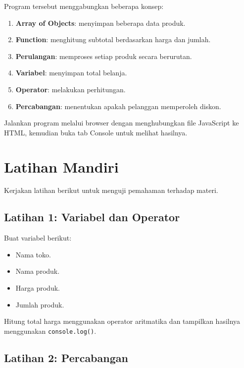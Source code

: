 \documentclass[12pt,a4paper]{article}
\begin{document}
Program tersebut menggabungkan beberapa konsep:

\begin{enumerate}
    \item \textbf{Array of Objects}: menyimpan beberapa
    data produk.
    \item \textbf{Function}: menghitung subtotal
    berdasarkan harga dan jumlah.
    \item \textbf{Perulangan}: memproses setiap produk
    secara berurutan.
    \item \textbf{Variabel}: menyimpan total belanja.
    \item \textbf{Operator}: melakukan perhitungan.
    \item \textbf{Percabangan}: menentukan apakah
    pelanggan memperoleh diskon.
\end{enumerate}

Jalankan program melalui browser dengan menghubungkan
file JavaScript ke HTML, kemudian buka tab Console
untuk melihat hasilnya.

\section{Latihan Mandiri}

Kerjakan latihan berikut untuk menguji pemahaman
terhadap materi.

\subsection{Latihan 1: Variabel dan Operator}

Buat variabel berikut:

\begin{itemize}
    \item Nama toko.
    \item Nama produk.
    \item Harga produk.
    \item Jumlah produk.
\end{itemize}

Hitung total harga menggunakan operator aritmatika
dan tampilkan hasilnya menggunakan
\texttt{console.log()}.

\subsection{Latihan 2: Percabangan}
\end{document}
